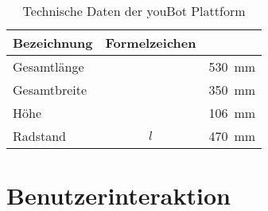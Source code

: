 
\begin{table}[ht]
	\centering
	\caption{Technische Daten der youBot Plattform}\label{tab.TechSpecYouBotBase}
	\vspace*{-3mm}
	\begin{tabular}[ht]{|l|c|r|}\hline
		\rowcolor{Snow2}
		Bezeichnung						& Formelzeichen	& \\ \hline
		Gesamtlänge 					&			& \SI{530}{\milli\meter}				\\ \hline
		Gesamtbreite 					&  		& \SI{350}{\milli\meter}				\\ \hline
		Höhe									&  		& \SI{106}{\milli\meter}				\\ \hline
		Radstand							& $l$	& \SI{470}{\milli\meter}				\\
		\hline
	\end{tabular} 
	\vspace*{-3mm}
\end{table}



\section{Benutzerinteraktion}

